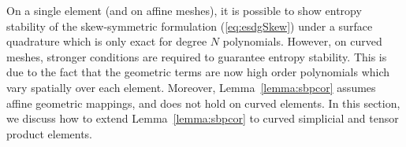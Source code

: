 \documentclass{svjour3}                     %
\renewcommand{\tilde}{\widetilde}
\newcommand{\diag}[1]{{\rm diag}\LRp{#1}}
\newcommand{\pd}[2]{\frac{\partial#1}{\partial#2}}
\newcommand{\LRp}[1]{\left( #1 \right)}
\newcommand{\LRs}[1]{\left[ #1 \right]}
\renewcommand{\note}[1]{{\color{blue}{#1}}}
\begin{document}
%
%
%


On a single element (and on affine meshes), it is possible to show entropy stability of the skew-symmetric formulation (\ref{eq:esdgSkew}) under a surface quadrature which is only exact for degree $N$ polynomials.  However, on curved meshes, stronger conditions are required to guarantee entropy stability.  This is due to the fact that the geometric terms are now high order polynomials which vary spatially over each element.  Moreover, Lemma~\ref{lemma:sbpcor} assumes affine geometric mappings, and does not hold on curved elements.  In this section, we discuss how to extend Lemma~\ref{lemma:sbpcor} to curved simplicial and tensor product elements.  
\end{document}
